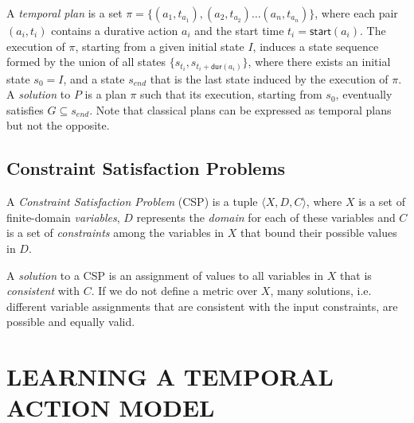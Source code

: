 \documentclass{ecai}
\newcommand{\tup}[1]{{\langle #1 \rangle}}
\newcommand{\dur}{\mathsf{dur}}    %
\newcommand{\start}{\mathsf{start}}%
\newcommand{\en}{\mathsf{end}}     %
\begin{document}
A {\em temporal plan} is a set $\pi=\{(a_1,t_{a_1}),(a_2,t_{a_2})\ldots (a_n,t_{a_n})\}$, where each pair $(a_i,t_i)$ contains a durative action $a_i$ and the start time $t_i=\start(a_i)$. The execution of $\pi$, starting from a given initial state $I$, induces a state sequence formed by the union of all states $\{s_{t_i}, s_{t_i+\dur(a_i)}\}$, where there exists an initial state $s_{0}=I$, and a state $s_{end}$ that is the last state induced by the execution of $\pi$. 
A {\em solution} to $P$ is a plan $\pi$ such that its execution, starting from $s_{0}$, eventually satisfies $G\subseteq s_{end}$. 
Note that classical plans can be expressed as temporal plans but not the opposite. 


\subsection{Constraint Satisfaction Problems}

A {\em Constraint Satisfaction Problem} (CSP) is a tuple $\tup{X,D,C}$, where $X$ is a set of finite-domain {\em variables}, $D$ represents the {\em domain} for each of these variables and $C$ is a set of {\em constraints} among the variables in $X$ that bound their possible values in $D$.

A {\em solution} to a CSP is an assignment of values to all variables in $X$ that is {\em consistent} with $C$.
If we do not define a metric over $X$, many solutions, i.e. different variable assignments that are consistent with the input constraints, are possible and equally valid.




\section{LEARNING A TEMPORAL ACTION MODEL}
\label{section:learningTemporalModels}
\end{document}
